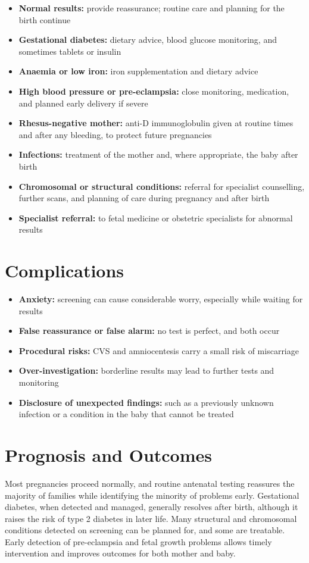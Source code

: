 \begin{itemize}
    \item \textbf{Normal results:} provide reassurance; routine care and planning for the birth continue
    \item \textbf{Gestational diabetes:} dietary advice, blood glucose monitoring, and sometimes tablets or insulin
    \item \textbf{Anaemia or low iron:} iron supplementation and dietary advice
    \item \textbf{High blood pressure or pre-eclampsia:} close monitoring, medication, and planned early delivery if severe
    \item \textbf{Rhesus-negative mother:} anti-D immunoglobulin given at routine times and after any bleeding, to protect future pregnancies
    \item \textbf{Infections:} treatment of the mother and, where appropriate, the baby after birth
    \item \textbf{Chromosomal or structural conditions:} referral for specialist counselling, further scans, and planning of care during pregnancy and after birth
    \item \textbf{Specialist referral:} to fetal medicine or obstetric specialists for abnormal results
\end{itemize}

\section*{Complications}
\begin{itemize}
    \item \textbf{Anxiety:} screening can cause considerable worry, especially while waiting for results
    \item \textbf{False reassurance or false alarm:} no test is perfect, and both occur
    \item \textbf{Procedural risks:} CVS and amniocentesis carry a small risk of miscarriage
    \item \textbf{Over-investigation:} borderline results may lead to further tests and monitoring
    \item \textbf{Disclosure of unexpected findings:} such as a previously unknown infection or a condition in the baby that cannot be treated
\end{itemize}

\section*{Prognosis and Outcomes}
Most pregnancies proceed normally, and routine antenatal testing reassures the majority of families while identifying the minority of problems early. Gestational diabetes, when detected and managed, generally resolves after birth, although it raises the risk of type 2 diabetes in later life. Many structural and chromosomal conditions detected on screening can be planned for, and some are treatable. Early detection of pre-eclampsia and fetal growth problems allows timely intervention and improves outcomes for both mother and baby.


